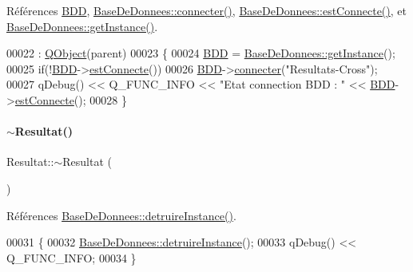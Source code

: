 Références \hyperlink{class_resultat_a25f2253e282cbedcd012c8496e219d86}{B\+DD}, \hyperlink{class_base_de_donnees_ab2e092285ccc0ee1cce61a1774218561}{Base\+De\+Donnees\+::connecter()}, \hyperlink{class_base_de_donnees_a00388973f3ec42e5c8e76e7af7e124b2}{Base\+De\+Donnees\+::est\+Connecte()}, et \hyperlink{class_base_de_donnees_a80028aa2b6b4fbf30fb2e36357b7d3d3}{Base\+De\+Donnees\+::get\+Instance()}.


\begin{DoxyCode}
00022                                   : \hyperlink{class_q_object}{QObject}(parent)
00023 \{
00024     \hyperlink{class_resultat_a25f2253e282cbedcd012c8496e219d86}{BDD} = \hyperlink{class_base_de_donnees_a80028aa2b6b4fbf30fb2e36357b7d3d3}{BaseDeDonnees::getInstance}();
00025     \textcolor{keywordflow}{if}(!\hyperlink{class_resultat_a25f2253e282cbedcd012c8496e219d86}{BDD}->\hyperlink{class_base_de_donnees_a00388973f3ec42e5c8e76e7af7e124b2}{estConnecte}())
00026         \hyperlink{class_resultat_a25f2253e282cbedcd012c8496e219d86}{BDD}->\hyperlink{class_base_de_donnees_ab2e092285ccc0ee1cce61a1774218561}{connecter}(\textcolor{stringliteral}{"Resultats-Cross"});
00027     qDebug() << Q\_FUNC\_INFO << \textcolor{stringliteral}{"Etat connection BDD : "} << \hyperlink{class_resultat_a25f2253e282cbedcd012c8496e219d86}{BDD}->\hyperlink{class_base_de_donnees_a00388973f3ec42e5c8e76e7af7e124b2}{estConnecte}();
00028 \}
\end{DoxyCode}
\mbox{\label{class_resultat_ae159333a3c5b89b8f307086bac618d7c}} 
\paragraph{\texorpdfstring{$\sim$\+Resultat()}{~Resultat()}}
{\footnotesize\ttfamily Resultat\+::$\sim$\+Resultat (\begin{DoxyParamCaption}{ }\end{DoxyParamCaption})}



Références \hyperlink{class_base_de_donnees_a457401c0816b888c77ce915997545f4e}{Base\+De\+Donnees\+::detruire\+Instance()}.


\begin{DoxyCode}
00031 \{
00032     \hyperlink{class_base_de_donnees_a457401c0816b888c77ce915997545f4e}{BaseDeDonnees::detruireInstance}();
00033     qDebug() << Q\_FUNC\_INFO;
00034 \}
\end{DoxyCode}


